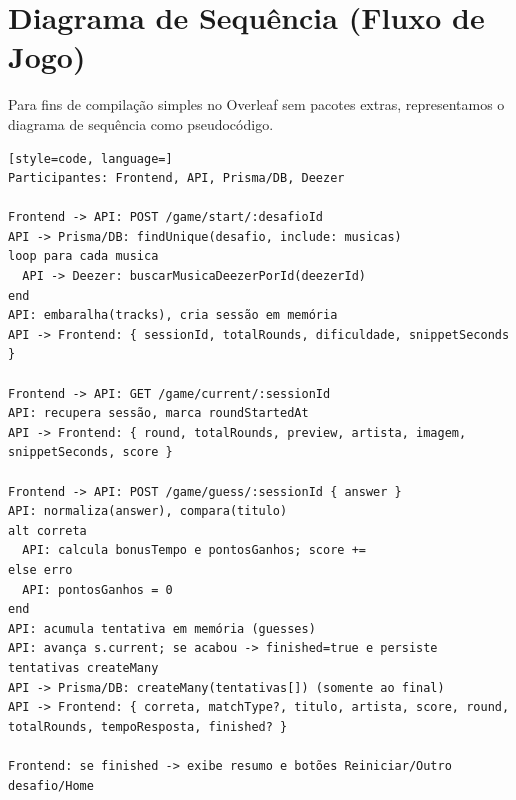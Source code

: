 \documentclass[12pt,a4paper]{article}
\begin{document}
\section{Diagrama de Sequ\^encia (Fluxo de Jogo)}
Para fins de compila\c{c}\~ao simples no Overleaf sem pacotes extras, representamos o diagrama de sequ\^encia como pseudoc\'odigo.

\begin{lstlisting}[style=code, language=]
Participantes: Frontend, API, Prisma/DB, Deezer

Frontend -> API: POST /game/start/:desafioId
API -> Prisma/DB: findUnique(desafio, include: musicas)
loop para cada musica
  API -> Deezer: buscarMusicaDeezerPorId(deezerId)
end
API: embaralha(tracks), cria sessão em memória
API -> Frontend: { sessionId, totalRounds, dificuldade, snippetSeconds }

Frontend -> API: GET /game/current/:sessionId
API: recupera sessão, marca roundStartedAt
API -> Frontend: { round, totalRounds, preview, artista, imagem, snippetSeconds, score }

Frontend -> API: POST /game/guess/:sessionId { answer }
API: normaliza(answer), compara(titulo)
alt correta
  API: calcula bonusTempo e pontosGanhos; score +=
else erro
  API: pontosGanhos = 0
end
API: acumula tentativa em memória (guesses)
API: avança s.current; se acabou -> finished=true e persiste tentativas createMany
API -> Prisma/DB: createMany(tentativas[]) (somente ao final)
API -> Frontend: { correta, matchType?, titulo, artista, score, round, totalRounds, tempoResposta, finished? }

Frontend: se finished -> exibe resumo e botões Reiniciar/Outro desafio/Home
\end{lstlisting}
\end{document}
